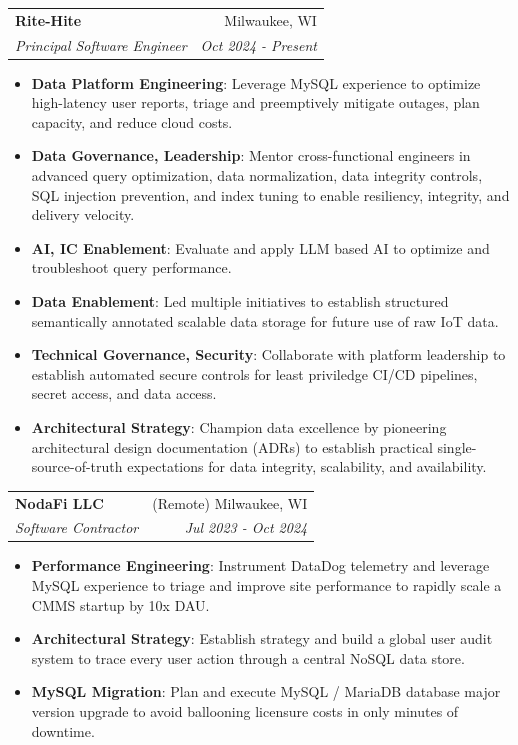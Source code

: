 \documentclass[letterpaper,11pt]{article}
\makeatletter
\newcommand{\resumeItem}[2]{
  \item\small{
    \textbf{#1}{: #2 \vspace{-2pt}}
  }
}
\newcommand{\resumeSubheading}[4]{
  \vspace{-1pt}\item
    \begin{tabular*}{0.97\textwidth}{l@{\extracolsep{\fill}}r}
      \textbf{#1} & #2 \\
      \textit{\small#3} & \textit{\small #4} \\
    \end{tabular*}\vspace{-5pt}
}
\newcommand{\resumeItemListStart}{\begin{itemize}}
\newcommand{\resumeItemListEnd}{\end{itemize}\vspace{-5pt}}
\makeatother
\begin{document}
    \resumeSubheading
      {Rite-Hite}{Milwaukee, WI}
      {Principal Software Engineer}{Oct 2024 - Present}
      \resumeItemListStart
        \resumeItem{Data Platform Engineering}
          {Leverage MySQL experience to optimize high-latency user reports, triage and preemptively mitigate outages, plan capacity, and reduce cloud costs.}
        \resumeItem{Data Governance, Leadership}
          {Mentor cross-functional engineers in advanced query optimization, data normalization, data integrity controls, SQL injection prevention, and index tuning to enable resiliency, integrity, and delivery velocity.}
        \resumeItem{AI, IC Enablement}
          {Evaluate and apply LLM based AI to optimize and troubleshoot query performance.}
        \resumeItem{Data Enablement}
          {Led multiple initiatives to establish structured semantically annotated scalable data storage for future use of raw IoT data.}
        \resumeItem{Technical Governance, Security}
          {Collaborate with platform leadership to establish automated secure controls for least priviledge CI/CD pipelines, secret access, and data access.}
        \resumeItem{Architectural Strategy}
          {Champion data excellence by pioneering architectural design documentation (ADRs) to establish practical single-source-of-truth expectations for data integrity, scalability, and availability.}
      \resumeItemListEnd

    \resumeSubheading
      {NodaFi LLC}{(Remote) Milwaukee, WI}
      {Software Contractor}{Jul 2023 - Oct 2024}
      \resumeItemListStart
        \resumeItem{Performance Engineering}
          {Instrument DataDog telemetry and leverage MySQL experience to triage and improve site performance to rapidly scale a CMMS startup by 10x DAU.}
        \resumeItem{Architectural Strategy}
          {Establish strategy and build a global user audit system to trace every user action through a central NoSQL data store.}
        \resumeItem{MySQL Migration}
          {Plan and execute MySQL / MariaDB database major version upgrade to avoid ballooning licensure costs in only minutes of downtime.}
      \resumeItemListEnd
\end{document}
